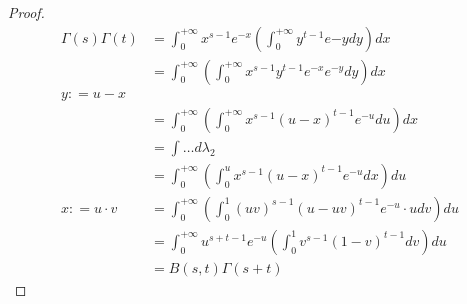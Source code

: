 \begin{proof}
    \begin{align*}
        \Gamma(s)\Gamma(t) & = \int_0^{+\infty} x^{s - 1}e^{ - x}\left( \int_0^{+\infty} y^{t - 1}e{ - y}dy \right)dx         \\
                           & = \int_0^{+\infty} \left( \int_0^{+\infty} x^{s - 1}y^{t - 1} e^{ - x}e^{ - y} dy \right) dx     \\
        y : = u - x                                                                                                           \\
                           & = \int_0^{+\infty} \left( \int_0^{+\infty} x^{s - 1}(u - x)^{t - 1} e^{ - u} du \right) dx       \\
                           & = \int \dots d\lambda_2                                                                          \\
                           & = \int_0^{+\infty} \left( \int_0^u x^{s - 1}(u - x)^{t - 1} e^{ - u} dx \right) du               \\
        x : = u\cdot v
                           & = \int_0^{+\infty} \left( \int_0^1 (uv)^{s - 1}(u - uv)^{t - 1} e^{ - u} \cdot u dv \right) du   \\
                           & = \int_0^{+\infty} u^{s + t - 1} e^{ - u} \left( \int_0^1 v^{s - 1}(1 - v)^{t - 1} dv \right) du \\
                           & = B(s, t) \Gamma(s + t)
    \end{align*}
\end{proof}

